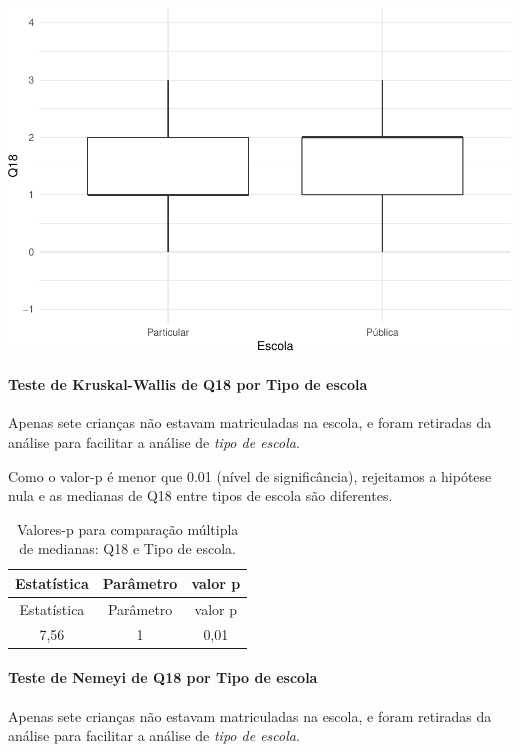 \documentclass[]{article}
\let\oldparagraph\paragraph
\renewcommand{\paragraph}[1]{\oldparagraph{#1}\mbox{}}
\begin{document}
\begin{center}\includegraphics[width=0.75\linewidth]{relatorio_covid19_files/figure-latex/unnamed-chunk-294-1} \end{center}

\hypertarget{teste-de-kruskal-wallis-de-q18-por-tipo-de-escola}{%
\paragraph{Teste de Kruskal-Wallis de Q18 por Tipo de escola}\label{teste-de-kruskal-wallis-de-q18-por-tipo-de-escola}}

Apenas sete crianças não estavam matriculadas na escola, e foram retiradas da análise para facilitar a análise de \emph{tipo de escola}.

Como o valor-p é menor que 0.01 (nível de significância), rejeitamos a hipótese nula e as medianas de Q18 entre tipos de escola são diferentes.

\begin{longtable}[]{@{}ccc@{}}
\caption{\label{tab:unnamed-chunk-296}Valores-p para comparação múltipla de medianas: Q18 e Tipo de escola.}\tabularnewline
\toprule
Estatística & Parâmetro & valor p\tabularnewline
\midrule
\endfirsthead
\toprule
Estatística & Parâmetro & valor p\tabularnewline
\midrule
\endhead
7,56 & 1 & 0,01\tabularnewline
\bottomrule
\end{longtable}

\hypertarget{teste-de-nemeyi-de-q18-por-tipo-de-escola}{%
\paragraph{Teste de Nemeyi de Q18 por Tipo de escola}\label{teste-de-nemeyi-de-q18-por-tipo-de-escola}}

Apenas sete crianças não estavam matriculadas na escola, e foram retiradas da análise para facilitar a análise de \emph{tipo de escola}.
\end{document}
